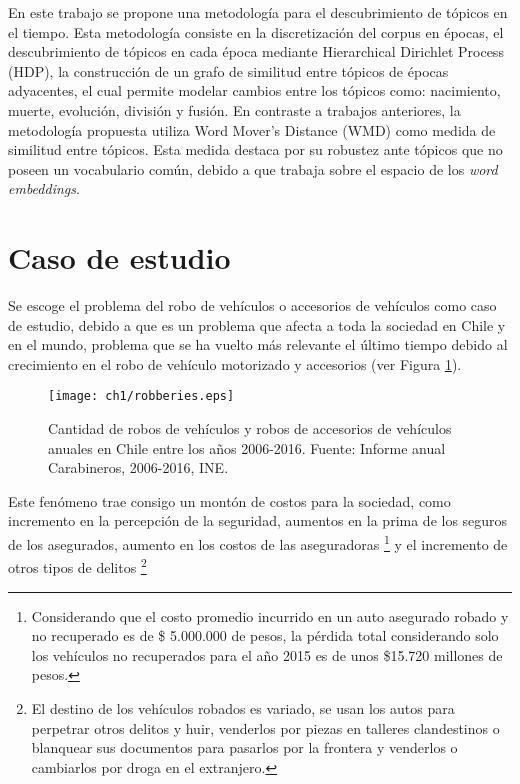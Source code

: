 \documentclass[letterpaper,12pt,oneside]{book} %
\begin{document}
En este trabajo se propone una metodología para el descubrimiento de tópicos en el tiempo. Esta metodología consiste en la discretización del corpus en épocas, el descubrimiento de tópicos en cada época mediante Hierarchical Dirichlet Process (HDP), la construcción de un grafo de similitud entre tópicos de épocas adyacentes, el cual permite modelar cambios entre los tópicos como: nacimiento, muerte, evolución, división y fusión. En contraste a trabajos anteriores, la metodología propuesta utiliza Word Mover's Distance (WMD) como medida de similitud entre tópicos. Esta medida destaca por su robustez ante tópicos que no poseen un vocabulario común, debido a que trabaja sobre el espacio de los \textit{word embeddings}.\\

\section{Caso de estudio}

Se escoge el problema del robo de vehículos o accesorios de vehículos como caso de estudio, debido a que es un problema que afecta a toda la sociedad en Chile y en el mundo, problema que se ha vuelto más relevante el último tiempo debido al crecimiento en el robo de vehículo motorizado y accesorios (ver Figura \ref{fig:antecedente}).\\ 

\begin{figure}
    \texttt{[image: ch1/robberies.eps]} 
    \caption{Cantidad de robos de vehículos y robos de accesorios de vehículos anuales en Chile entre los años 2006-2016. Fuente: Informe anual Carabineros, 2006-2016, INE.} 
    \label{fig:antecedente}
\end{figure}

Este fenómeno trae consigo un montón de costos para la sociedad, como incremento en la percepción de la seguridad, aumentos en la prima de los seguros de los asegurados, aumento en los costos de las aseguradoras \footnote{Considerando que el costo promedio incurrido en un auto asegurado robado y no recuperado es de \$ 5.000.000 de pesos, la pérdida total considerando solo los vehículos no recuperados para el año 2015 es de unos \$15.720 millones de pesos.} y el incremento de otros tipos de delitos \footnote{El destino de los vehículos robados es variado, se usan los autos para perpetrar otros delitos y huir, venderlos por piezas en talleres clandestinos o blanquear sus documentos para pasarlos por la frontera y venderlos o cambiarlos por droga en el extranjero.}
\end{document}
